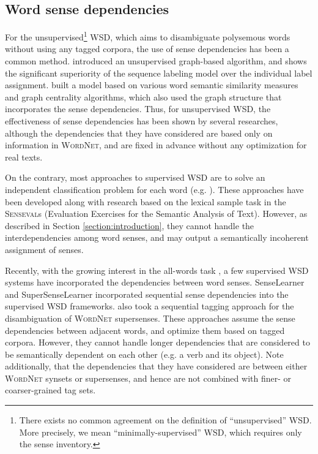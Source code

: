 \documentclass[english]{jnlp_1.4}
\begin{document}
\subsection{Word sense dependencies}

For the unsupervised\footnote{There exists no common agreement on the definition of ``unsupervised'' WSD. More precisely, we mean ``minimally-supervised'' WSD, which requires only the sense inventory.} WSD, which aims to disambiguate polysemous words without using any tagged corpora, the use of sense dependencies has been a common method.
\cite{mihalcea:2005} introduced an unsupervised graph-based algorithm, and shows the significant superiority of the sequence labeling model over the individual label assignment.
\cite{sinha:2007} built a model based on various word semantic similarity measures and graph centrality algorithms, which also used the graph structure that incorporates the sense dependencies.
Thus, for unsupervised WSD, the effectiveness of sense dependencies has been shown by several researches, although the dependencies that they have considered are based only on information in \textsc{WordNet}, and are fixed in advance without any optimization for real texts.


On the contrary, most approaches to supervised WSD are to solve an independent classification problem for each word (e.g. \cite{decadt:2004,kohomban:2005,tratz:2007}).
These approaches have been developed along with research based on the lexical sample task \cite{mihalcea:2004:senseval3} in the \textsc{Senseval}s (Evaluation Exercises for the Semantic Analysis of Text).
However, as described in Section \ref{section:introduction}, they cannot handle the interdependencies among word senses, and may output a semantically incoherent assignment of senses.


Recently, with the growing interest in the all-words task \cite{snyder:2004}, a few supervised WSD systems have incorporated the dependencies between word senses.
SenseLearner \cite{mihalcea:2004} and SuperSenseLearner \cite{mihalcea:2007} incorporated sequential sense dependencies into the supervised WSD frameworks.
\cite{ciaramita:2006} also took a sequential tagging approach for the disambiguation of \textsc{WordNet} supersenses.
These approaches assume the sense dependencies between adjacent words, and optimize them based on tagged corpora.
However, they cannot handle longer dependencies that are considered to be semantically dependent on each other (e.g. a verb and its object).
Note additionally, that the dependencies that they have considered are between either \textsc{WordNet} synsets or supersenses, and hence are not combined with finer- or coarser-grained tag sets.
\end{document}
